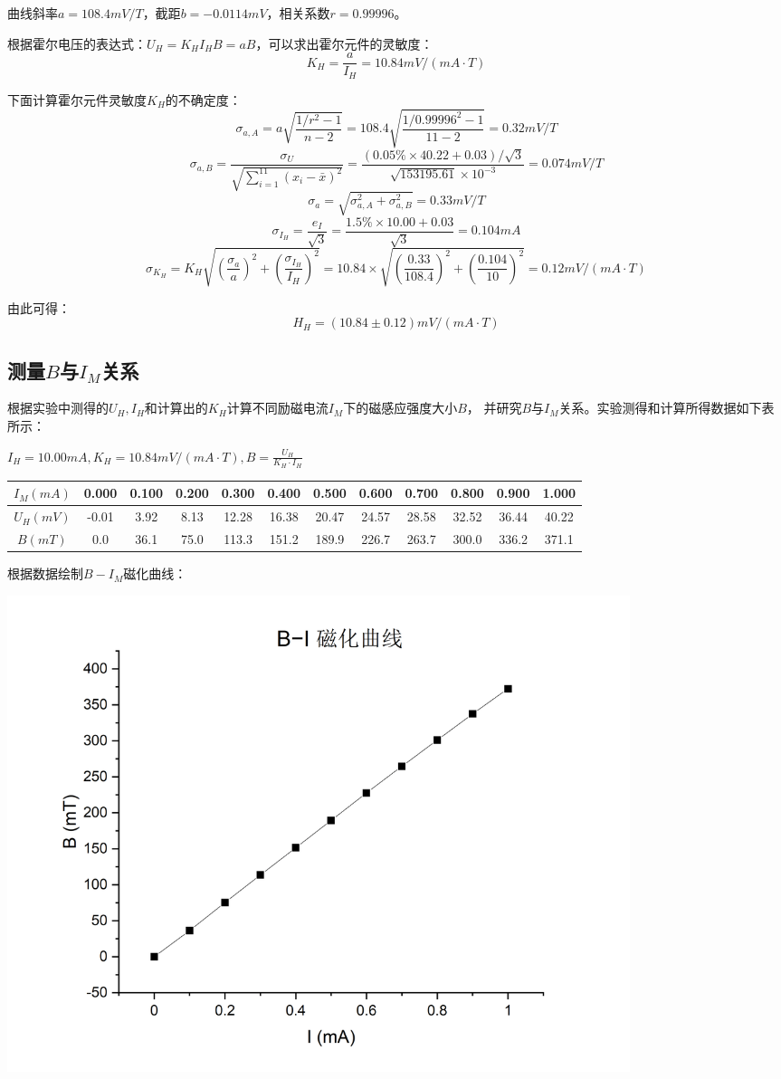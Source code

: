 \documentclass{article}
\begin{document}
    曲线斜率$a=108.4mV/T$，截距$b=-0.0114mV$，相关系数$r=0.99996$。

    根据霍尔电压的表达式：$U_H=K_H I_H B=aB$，可以求出霍尔元件的灵敏度：
    $$K_H=\frac{a}{I_H}=10.84mV/(mA\cdot T)$$

    下面计算霍尔元件灵敏度$K_H$的不确定度：
    $$\sigma_{a,A}=a\sqrt{\frac{1/r^2-1}{n-2}}=108.4\sqrt{\frac{1/0.99996^2-1}{11-2}}=0.32mV/T$$
    $$\sigma_{a,B}=\frac{\sigma_U}{\sqrt{\sum_{i=1}^{11} (x_i-\bar{x})^2}}=\frac{(0.05\%\times40.22+0.03)/\sqrt{3}}{\sqrt{153195.61}\times 10^{-3}}=0.074mV/T$$
    $$\sigma_a=\sqrt{\sigma_{a,A}^2+\sigma_{a,B}^2}=0.33mV/T$$
    $$\sigma_{I_H}=\frac{e_I}{\sqrt{3}}=\frac{1.5\%\times 10.00+0.03}{\sqrt{3}}=0.104mA$$
    $$\sigma_{K_H}=K_H\sqrt{(\frac{\sigma_a}{a})^2+(\frac{\sigma_{I_H}}{I_H})^2}=10.84\times \sqrt{(\frac{0.33}{108.4})^2+(\frac{0.104}{10})^2}=0.12mV/(mA\cdot T)$$

    由此可得：
    $$H_H=(10.84\pm 0.12)mV/(mA\cdot T)$$

    \subsection{测量$B$与$I_M$关系}
    根据实验中测得的$U_H,I_H$和计算出的$K_H$计算不同励磁电流$I_M$下的磁感应强度大小$B$，
    并研究$B$与$I_M$关系。实验测得和计算所得数据如下表所示：

    $I_H=10.00mA,K_H=10.84mV/(mA\cdot T),B=\frac{U_H}{K_H\cdot I_H}$

    \vspace{1ex}
    \begin{tabular}{|c|c|c|c|c|c|c|c|c|c|c|c|}
        \hline
        $I_M(mA)$ & 0.000 & 0.100 & 0.200 & 0.300 & 0.400 & 0.500 & 0.600 & 0.700 & 0.800 & 0.900 & 1.000\\
        \hline
        $U_H(mV)$ & -0.01 & 3.92 & 8.13 & 12.28 & 16.38 & 20.47 & 24.57 & 28.58 & 32.52 & 36.44 & 40.22\\
        \hline
        $B(mT)$ & 0.0 & 36.1 & 75.0 & 113.3 & 151.2 & 189.9 & 226.7 & 263.7 & 300.0 & 336.2 & 371.1\\
        \hline
    \end{tabular}
    \vspace{1ex}
    
    根据数据绘制$B-I_M$磁化曲线：
    \begin{center}
        \includegraphics[width=0.8\textwidth]{B-I curve.jpg}
    \end{center}
\end{document}
